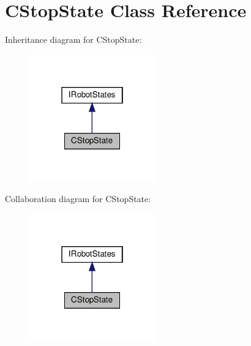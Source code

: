 \hypertarget{classCStopState}{}\section{C\+Stop\+State Class Reference}
\label{classCStopState}


Inheritance diagram for C\+Stop\+State\+:\nopagebreak
\begin{figure}[H]
\begin{center}
\leavevmode
\includegraphics[width=154pt]{classCStopState__inherit__graph}
\end{center}
\end{figure}


Collaboration diagram for C\+Stop\+State\+:\nopagebreak
\begin{figure}[H]
\begin{center}
\leavevmode
\includegraphics[width=154pt]{classCStopState__coll__graph}
\end{center}
\end{figure}
